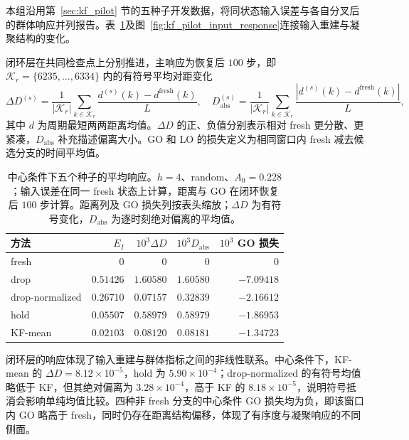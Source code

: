\documentclass[UTF8,fontset=windows,11pt]{ctexart}
\begin{document}
本组沿用第~\ref{sec:kf_pilot} 节的五种子开发数据，将同状态输入误差与各自分叉后的群体响应并列报告。表~\ref{tab:kf_pilot_center}及图~\ref{fig:kf_pilot_input_response}连接输入重建与凝聚结构的变化。

闭环层在共同检查点上分别推进，主响应为恢复后 $100$ 步，即 $\mathcal K_r=\{6235,\ldots,6334\}$ 内的有符号平均对距变化
\begin{equation}
 \Delta D^{(s)}=\frac{1}{|\mathcal K_r|}\sum_{k\in\mathcal K_r}
 \frac{d^{(s)}(k)-d^{\mathrm{fresh}}(k)}{L},
 \quad
 D_{\mathrm{abs}}^{(s)}=\frac{1}{|\mathcal K_r|}\sum_{k\in\mathcal K_r}
 \frac{|d^{(s)}(k)-d^{\mathrm{fresh}}(k)|}{L},
 \label{eq:pilot_distance_metrics}
\end{equation}
其中 $d$ 为周期最短两两距离均值。$\Delta D$ 的正、负值分别表示相对 fresh 更分散、更紧凑，$D_{\mathrm{abs}}$ 补充描述偏离大小。GO 和 LO 的损失定义为相同窗口内 fresh 减去候选分支的时间平均值。


\begin{table}[!tbp]
 \centering
 \small
 \caption{中心条件下五个种子的平均响应。$h=4$、random、$A_0=0.228$；输入误差在同一 fresh 状态上计算，距离与 GO 在闭环恢复后 $100$ 步计算。距离列及 GO 损失列按表头缩放；$\Delta D$ 为有符号变化，$D_{\mathrm{abs}}$ 为逐时刻绝对偏离的平均值。}
 \label{tab:kf_pilot_center}
 \begin{tabular}{lrrrr}
  \toprule
  方法 & $E_I$ & $10^3\Delta D$ & $10^3D_{\mathrm{abs}}$ & $10^3$ GO 损失\\
  \midrule
  fresh & $0$ & $0$ & $0$ & $0$\\
  drop & $0.51426$ & $1.60580$ & $1.60580$ & $-7.09418$\\
  drop-normalized & $0.26710$ & $0.07157$ & $0.32839$ & $-2.16612$\\
  hold & $0.05507$ & $0.58979$ & $0.58979$ & $-1.86953$\\
  KF-mean & $0.02103$ & $0.08120$ & $0.08181$ & $-1.34723$\\
  \bottomrule
 \end{tabular}
\end{table}

闭环层的响应体现了输入重建与群体指标之间的非线性联系。中心条件下，KF-mean 的 $\Delta D=8.12\times10^{-5}$，hold 为 $5.90\times10^{-4}$；drop-normalized 的有符号均值略低于 KF，但其绝对偏离为 $3.28\times10^{-4}$，高于 KF 的 $8.18\times10^{-5}$，说明符号抵消会影响单纯均值比较。四种非 fresh 分支的中心条件 GO 损失均为负，即该窗口内 GO 略高于 fresh，同时仍存在距离结构偏移，体现了有序度与凝聚响应的不同侧面。
\end{document}
